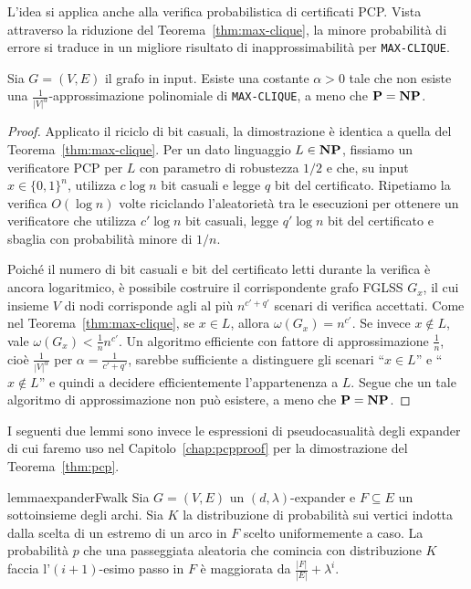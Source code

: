 L'idea si applica anche alla verifica probabilistica di certificati PCP.
Vista attraverso la riduzione del Teorema~\ref{thm:max-clique}, la minore
probabilità di errore si traduce in un migliore risultato di inapprossimabilità
per \texttt{MAX-CLIQUE}.

\begin{corollary} \label{thm:maxclique-inapprox-nc}
	Sia $G = (V, E)$ il grafo in input. Esiste una costante $\alpha > 0$ tale
	che non esiste una $\frac1{{|V|}^\alpha}$-approssimazione polinomiale di
	\texttt{MAX-CLIQUE}, a meno che $\mathbf{P} = \mathbf{NP}$.
\end{corollary}

\begin{proof}
	Applicato il riciclo di bit casuali, la dimostrazione è identica a quella
	del Teorema~\ref{thm:max-clique}.
	Per un dato linguaggio $L \in \mathbf{NP}$, fissiamo un verificatore PCP per $L$
	con parametro di robustezza $1 / 2$ e che, su input
	$x \in \{0, 1\}^n$, utilizza $c \log n$ bit casuali e legge $q$ bit del
	certificato.
	Ripetiamo la verifica $O(\log n)$ volte riciclando l'aleatorietà tra le
	esecuzioni per ottenere un verificatore che utilizza $c' \log n$ bit
	casuali, legge $q' \log n$ bit del certificato e sbaglia con probabilità
	minore di $1 / n$.

	Poiché il numero di bit casuali e bit del certificato letti
	durante la verifica è ancora logaritmico, è possibile costruire il
	corrispondente grafo FGLSS $G_x$, il cui insieme $V$ di nodi corrisponde
	agli al più $n^{c' + q'}$ scenari di verifica accettati.
	Come nel Teorema~\ref{thm:max-clique}, se $x \in L$, allora
	$\omega(G_x) = n^{c'}$. Se invece $x \notin L$, vale
	$\omega(G_x) < \frac1{n} n^{c'}$. Un algoritmo efficiente con fattore di
	approssimazione $\frac1{n}$, cioè $\frac1{|V|^\alpha}$ per
	$\alpha = \frac1{c' + q'}$, sarebbe sufficiente a distinguere gli scenari
	``$x \in L$'' e ``$x \notin L$'' e quindi a decidere efficientemente
	l'appartenenza a $L$.
	Segue che un tale algoritmo di approssimazione non può esistere, a meno che
	$\mathbf{P} = \mathbf{NP}$.
\end{proof}

I seguenti due lemmi sono invece le espressioni di pseudocasualità degli
expander di cui faremo uso nel Capitolo~\ref{chap:pcpproof} per la
dimostrazione del Teorema~\ref{thm:pcp}.

\begin{restatable}{lemma}{expanderFwalk} \label{thm:Din06Prop2.5}
	Sia $G = (V, E)$ un $(d, \lambda)$-expander e $F \subseteq E$ un sottoinsieme
	degli archi. Sia $K$ la distribuzione di probabilità sui vertici indotta
	dalla scelta di un estremo di un arco in $F$ scelto uniformemente a caso.
	La probabilità $p$ che una passeggiata aleatoria che comincia con
	distribuzione $K$ faccia l'$(i+1)$-esimo passo in $F$ è maggiorata da
	$\frac{|F|}{|E|} + \lambda^i$.
\end{restatable}

